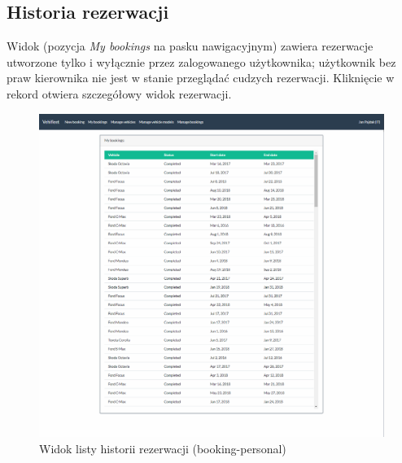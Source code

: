 \documentclass[eng,printmode,openany]{mgr}
\begin{document}
\begin{appendices}
		\section{Historia rezerwacji}
		Widok (pozycja \textit{My bookings} na pasku nawigacyjnym) zawiera rezerwacje utworzone tylko i wyłącznie przez zalogowanego użytkownika; użytkownik bez praw kierownika nie jest w stanie przeglądać cudzych rezerwacji. Kliknięcie w rekord otwiera szczegółowy widok rezerwacji.
		\begin{figure}[H]
			\centering
			\includegraphics[width=\textwidth]{images/views/booking-list.png}
			\caption{Widok listy historii rezerwacji (booking-personal)}
		\end{figure}

		\newpage

\end{appendices}
\end{document}
